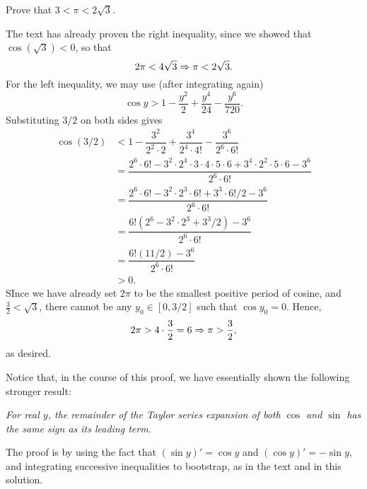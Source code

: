 \begin{exercise}
	Prove that $3<\pi<2\sqrt{3}$.
	
	\begin{sol}
		The text has already proven the right inequality, since we showed that $\cos(\sqrt{3})<0$, so that $$2\pi<4\sqrt{3} \Rightarrow \pi<2\sqrt{3}.$$ For the left inequality, we may use (after integrating again) $$\cos y>1-\dfrac{y^2}{2}+\dfrac{y^4}{24}-\dfrac{y^6}{720}.$$ Substituting $3/2$ on both sides gives
		\begin{align*}
		\cos(3/2) &<1-\dfrac{3^2}{2^2 \cdot 2}+\dfrac{3^4}{2^4 \cdot 4!}-\dfrac{3^6}{2^6 \cdot 6!} \\
		&=\dfrac{2^6 \cdot 6!-3^2 \cdot 2^4 \cdot 3 \cdot 4 \cdot 5 \cdot 6+3^4 \cdot 2^2 \cdot 5 \cdot 6-3^6}{2^6 \cdot 6!} \\
		&=\dfrac{2^6 \cdot 6!-3^2 \cdot 2^3 \cdot 6!+3^3 \cdot 6!/2-3^6}{2^6 \cdot 6!} \\
		&=\dfrac{6!(2^6-3^2 \cdot 2^3+3^3/2)-3^6}{2^6 \cdot 6!} \\
		&=\dfrac{6!(11/2)-3^6}{2^6 \cdot 6!} \\
		&>0.
		\end{align*}
		SInce we have already set $2\pi$ to be the smallest positive period of cosine, and $\frac{3}{2}<\sqrt{3}$, there cannot be any $y_0 \in [0,3/2]$ such that $\cos y_0=0$. Hence, $$2\pi>4 \cdot \dfrac{3}{2}=6 \Rightarrow \pi>\dfrac{3}{2},$$ as desired.
		
		\begin{remark}
			Notice that, in the course of this proof, we have essentially shown the following stronger result:
			\begin{center}
			\textit{For real $y$, the remainder of the Taylor series expansion of both $\cos$ and $\sin$ has the same sign as its leading term}.
			\end{center}
		 	The proof is by using the fact that $(\sin y)'=\cos y$ and $(\cos y)'=-\sin y$, and integrating successive inequalities to bootstrap, as in the text and in this solution.
		\end{remark}
	\end{sol}
\end{exercise}